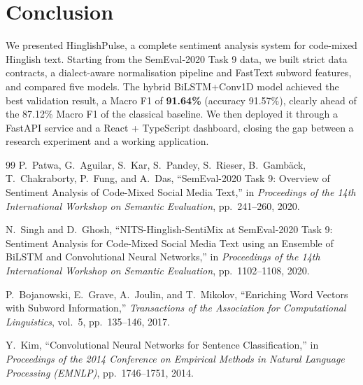 \documentclass[11pt,a4paper]{article}
\begin{document}
\section{Conclusion}

We presented HinglishPulse, a complete sentiment analysis system for code-mixed Hinglish text. Starting from the SemEval-2020 Task 9 data, we built strict data contracts, a dialect-aware normalisation pipeline and FastText subword features, and compared five models. The hybrid BiLSTM+Conv1D model achieved the best validation result, a Macro F1 of \textbf{91.64\%} (accuracy 91.57\%), clearly ahead of the 87.12\% Macro F1 of the classical baseline. We then deployed it through a FastAPI service and a React + TypeScript dashboard, closing the gap between a research experiment and a working application.

\begin{thebibliography}{99}
P.~Patwa, G.~Aguilar, S.~Kar, S.~Pandey, S.~Rieser, B.~Gamb{\"a}ck, T.~Chakraborty, P.~Fung, and A.~Das,
``SemEval-2020 Task 9: Overview of Sentiment Analysis of Code-Mixed Social Media Text,''
in \textit{Proceedings of the 14th International Workshop on Semantic Evaluation}, pp.~241--260, 2020.

N.~Singh and D.~Ghosh,
``NITS-Hinglish-SentiMix at SemEval-2020 Task 9: Sentiment Analysis for Code-Mixed Social Media Text using an Ensemble of BiLSTM and Convolutional Neural Networks,''
in \textit{Proceedings of the 14th International Workshop on Semantic Evaluation}, pp.~1102--1108, 2020.

P.~Bojanowski, E.~Grave, A.~Joulin, and T.~Mikolov,
``Enriching Word Vectors with Subword Information,''
\textit{Transactions of the Association for Computational Linguistics}, vol.~5, pp.~135--146, 2017.

Y.~Kim,
``Convolutional Neural Networks for Sentence Classification,''
in \textit{Proceedings of the 2014 Conference on Empirical Methods in Natural Language Processing (EMNLP)}, pp.~1746--1751, 2014.
\end{thebibliography}
\end{document}
